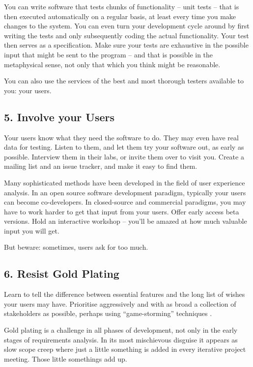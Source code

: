 \documentclass{bmcart}
\begin{document}
You can write software that tests chunks of functionality -- unit tests -- that is then executed automatically on a regular basis, at least every time you make changes to the system. You can even turn your development cycle around by first writing the tests and only subsequently coding the actual functionality. Your test then serves as a specification. Make sure your tests are exhaustive in the possible input that might be sent to the program -- and that is possible in the metaphysical sense, not only that which you think might be reasonable. 

You can also use the services of the best and most thorough testers available to you: your users. 

\subsection*{5. Involve your Users}

Your users know what they need the software to do. They may even have real data for testing. Listen to them, and let them try your software out, as early as possible. Interview them in their labs, or invite them over to visit you. Create a mailing list and an issue tracker, and make it easy to find them.  

Many sophisticated methods have been developed in the field of user experience analysis. In an open source software development paradigm, typically your users can become co-developers. In closed-source and commercial paradigms, you may have to work harder to get that input from your users. Offer early access beta versions. Hold an interactive workshop \cite{pavelin2014} -- you'll be amazed at how much valuable input you will get. 

But beware: sometimes, users ask for too much. 

\subsection*{6. Resist Gold Plating}

Learn to tell the difference between essential features and the long list of wishes your users may have. Prioritise aggressively and with as broad a collection of stakeholders as possible, perhaps using ``game-storming'' techniques \cite{gamestorm}.   

Gold plating is a challenge in all phases of development, not only in the early stages of requirements analysis. In its most mischievous disguise it appears as slow scope creep where just a little something is added in every iterative project meeting. Those little somethings add up. 
\end{document}
